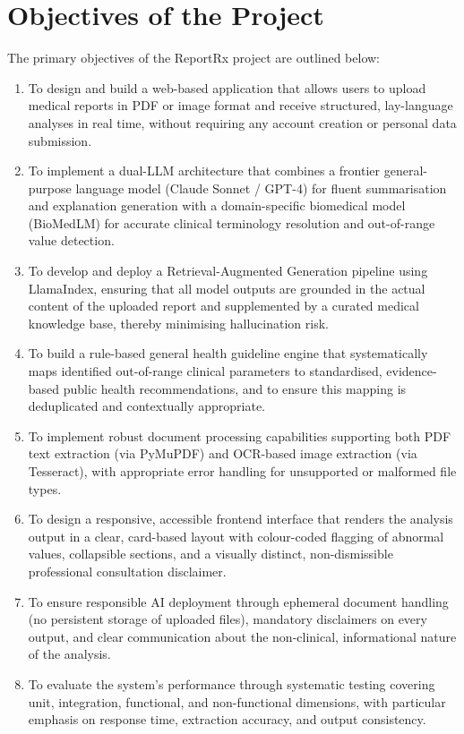 \section{Objectives of the Project}
The primary objectives of the ReportRx project are outlined below:

\begin{enumerate}
    \item To design and build a web-based application that allows users to upload medical reports in PDF or image format and receive structured, lay-language analyses in real time, without requiring any account creation or personal data submission.
    \item To implement a dual-LLM architecture that combines a frontier general-purpose language model (Claude Sonnet / GPT-4) for fluent summarisation and explanation generation with a domain-specific biomedical model (BioMedLM) for accurate clinical terminology resolution and out-of-range value detection.
    \item To develop and deploy a Retrieval-Augmented Generation pipeline using LlamaIndex, ensuring that all model outputs are grounded in the actual content of the uploaded report and supplemented by a curated medical knowledge base, thereby minimising hallucination risk.
    \item To build a rule-based general health guideline engine that systematically maps identified out-of-range clinical parameters to standardised, evidence-based public health recommendations, and to ensure this mapping is deduplicated and contextually appropriate.
    \item To implement robust document processing capabilities supporting both PDF text extraction (via PyMuPDF) and OCR-based image extraction (via Tesseract), with appropriate error handling for unsupported or malformed file types.
    \item To design a responsive, accessible frontend interface that renders the analysis output in a clear, card-based layout with colour-coded flagging of abnormal values, collapsible sections, and a visually distinct, non-dismissible professional consultation disclaimer.
    \item To ensure responsible AI deployment through ephemeral document handling (no persistent storage of uploaded files), mandatory disclaimers on every output, and clear communication about the non-clinical, informational nature of the analysis.
    \item To evaluate the system's performance through systematic testing covering unit, integration, functional, and non-functional dimensions, with particular emphasis on response time, extraction accuracy, and output consistency.
\end{enumerate}

